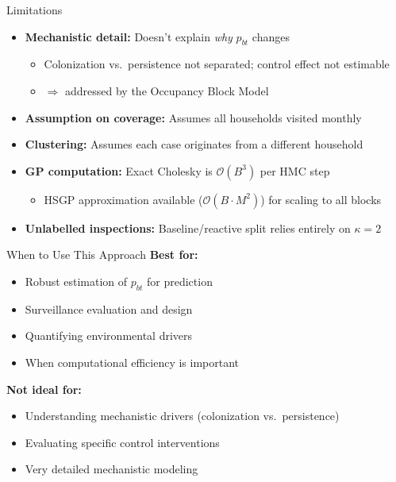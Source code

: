 \documentclass[aspectratio=169]{beamer}
\begin{document}
\begin{frame}{Limitations}
  \begin{itemize}
    \item \textbf{Mechanistic detail:} Doesn't explain \textit{why} $p_{bt}$ changes
      \begin{itemize}
        \item Colonization vs.\ persistence not separated; control effect not estimable
        \item $\Rightarrow$ addressed by the Occupancy Block Model
      \end{itemize}
    \item \textbf{Assumption on coverage:} Assumes all households visited monthly
    \item \textbf{Clustering:} Assumes each case originates from a different household
    \item \textbf{GP computation:} Exact Cholesky is $\mathcal{O}(B^3)$ per HMC step
      \begin{itemize}
        \item HSGP approximation available ($\mathcal{O}(B \cdot M^2)$) for scaling to all blocks
      \end{itemize}
    \item \textbf{Unlabelled inspections:} Baseline/reactive split relies entirely on $\kappa = 2$
  \end{itemize}
\end{frame}

\begin{frame}{When to Use This Approach}
  \textbf{Best for:}
  \begin{itemize}
    \item Robust estimation of $p_{bt}$ for prediction
    \item Surveillance evaluation and design
    \item Quantifying environmental drivers
    \item When computational efficiency is important
  \end{itemize}
  
  \vspace{1cm}
  
  \textbf{Not ideal for:}
  \begin{itemize}
    \item Understanding mechanistic drivers (colonization vs.\ persistence)
    \item Evaluating specific control interventions
    \item Very detailed mechanistic modeling
  \end{itemize}
\end{frame}
\end{document}
